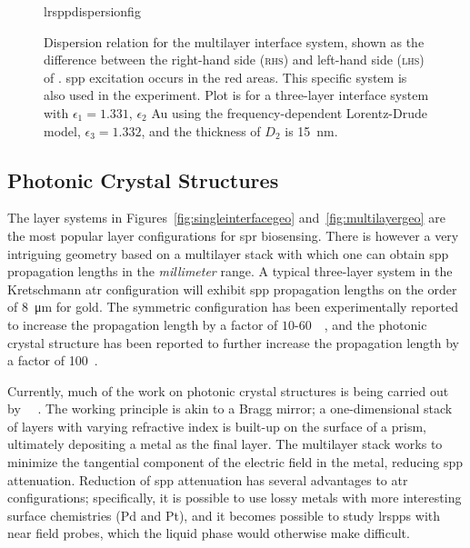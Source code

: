 \begin{figure}[ht]
  \centering
  {lrsppdispersionfig}
  \caption{Dispersion relation for the multilayer interface system, shown as the difference
    between the right-hand side (\textsc{rhs}) and left-hand side (\textsc{lhs}) of
    .  \gls{spp} excitation occurs in the red areas.
    This specific system is also used in the experiment.  Plot is for a three-layer interface system with $\epsilon_1=1.331$, $\epsilon_2$ Au using the
    frequency-dependent Lorentz-Drude model, $\epsilon_3=1.332$, and the
    thickness of $D_2$ is \SI{15}{\nano\meter}.  }
  \label{fig:lrsppdispersionrelation}
\end{figure}

\subsection{Photonic Crystal Structures}
The layer systems in Figures~\ref{fig:singleinterfacegeo}
and~\ref{fig:multilayergeo} are the most popular layer
configurations for \gls{spr} biosensing.  There is however a very intriguing
geometry based on a multilayer stack with which one can obtain \gls{spp}
propagation lengths in the \textit{millimeter} range.  A typical three-layer system in the Kretschmann \gls{atr} configuration will exhibit \gls{spp}
propagation lengths on the order of \SI{8}{\micro\meter} for gold.  The
symmetric configuration has been experimentally reported to increase the
propagation length by a factor of
$10$-$60$~\cite{kuwamura1983experimental}~\cite{craig1983experimental}, and
the photonic crystal structure has been reported to further increase the
propagation length by a factor of 100~\cite{konopsky2009long}.

Currently, much of the work on photonic crystal structures is being carried
out by ~\cite{konopsky2006long}~\cite{konopsky2009long}.
The working principle is akin to a Bragg mirror; a one-dimensional stack of
layers with varying refractive index is built-up on the surface of a prism,
ultimately depositing a metal as the final layer.  The multilayer stack
works to minimize the tangential component of the electric field in the
metal, reducing \gls{spp} attenuation.  Reduction of \gls{spp} attenuation has several
advantages to \gls{atr} configurations; specifically, it is possible to use lossy metals with
more interesting surface chemistries (Pd and Pt), and it becomes possible
to study \glspl{lrspp} with near field probes, which the
liquid phase would otherwise make difficult.
